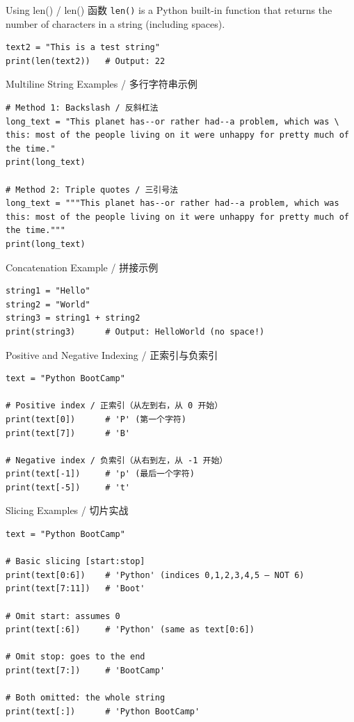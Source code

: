 \documentclass[11pt,a4paper]{report}
\let\oldtexttt\texttt
\renewcommand{\texttt}[1]{\textcolor{mainblue}{\oldtexttt{#1}}}
\begin{document}
\begin{examplebox}{Using len() / len() 函数}
    \texttt{len()} is a Python built-in function that returns the number of characters in a string (including spaces).
\begin{lstlisting}
text2 = "This is a test string"
print(len(text2))   # Output: 22
\end{lstlisting}
\end{examplebox}

\begin{examplebox}{Multiline String Examples / 多行字符串示例}
\begin{lstlisting}
# Method 1: Backslash / 反斜杠法
long_text = "This planet has--or rather had--a problem, which was \
this: most of the people living on it were unhappy for pretty much of the time."
print(long_text)

# Method 2: Triple quotes / 三引号法
long_text = """This planet has--or rather had--a problem, which was
this: most of the people living on it were unhappy for pretty much of the time."""
print(long_text)
\end{lstlisting}
\end{examplebox}

\begin{examplebox}{Concatenation Example / 拼接示例}
\begin{lstlisting}
string1 = "Hello"
string2 = "World"
string3 = string1 + string2
print(string3)      # Output: HelloWorld (no space!)
\end{lstlisting}
\end{examplebox}

\begin{examplebox}{Positive and Negative Indexing / 正索引与负索引}
\begin{lstlisting}
text = "Python BootCamp"

# Positive index / 正索引（从左到右，从 0 开始）
print(text[0])      # 'P' (第一个字符)
print(text[7])      # 'B'

# Negative index / 负索引（从右到左，从 -1 开始）
print(text[-1])     # 'p' (最后一个字符)
print(text[-5])     # 't'
\end{lstlisting}
\end{examplebox}

\begin{examplebox}{Slicing Examples / 切片实战}
\begin{lstlisting}
text = "Python BootCamp"

# Basic slicing [start:stop]
print(text[0:6])    # 'Python' (indices 0,1,2,3,4,5 — NOT 6)
print(text[7:11])   # 'Boot'

# Omit start: assumes 0
print(text[:6])     # 'Python' (same as text[0:6])

# Omit stop: goes to the end
print(text[7:])     # 'BootCamp'

# Both omitted: the whole string
print(text[:])      # 'Python BootCamp'
\end{lstlisting}
\end{examplebox}
\end{document}
